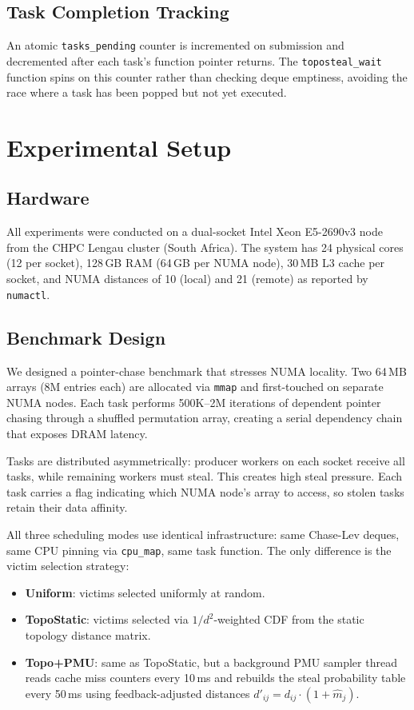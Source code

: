 \documentclass[conference]{IEEEtran}
\begin{document}
\subsection{Task Completion Tracking}

An atomic \texttt{tasks\_pending} counter is incremented on submission and decremented after each task's function pointer returns. The \texttt{toposteal\_wait} function spins on this counter rather than checking deque emptiness, avoiding the race where a task has been popped but not yet executed.

\section{Experimental Setup}

\subsection{Hardware}

All experiments were conducted on a dual-socket Intel Xeon E5-2690v3 node from the CHPC Lengau cluster (South Africa). The system has 24 physical cores (12 per socket), 128\,GB RAM (64\,GB per NUMA node), 30\,MB L3 cache per socket, and NUMA distances of 10 (local) and 21 (remote) as reported by \texttt{numactl}.

\subsection{Benchmark Design}

We designed a pointer-chase benchmark that stresses NUMA locality. Two 64\,MB arrays (8M entries each) are allocated via \texttt{mmap} and first-touched on separate NUMA nodes. Each task performs 500K--2M iterations of dependent pointer chasing through a shuffled permutation array, creating a serial dependency chain that exposes DRAM latency.

Tasks are distributed asymmetrically: producer workers on each socket receive all tasks, while remaining workers must steal. This creates high steal pressure. Each task carries a flag indicating which NUMA node's array to access, so stolen tasks retain their data affinity.

All three scheduling modes use identical infrastructure: same Chase-Lev deques, same CPU pinning via \texttt{cpu\_map}, same task function. The only difference is the victim selection strategy:
\begin{itemize}
    \item \textbf{Uniform}: victims selected uniformly at random.
    \item \textbf{TopoStatic}: victims selected via $1/d^2$-weighted CDF from the static topology distance matrix.
    \item \textbf{Topo+PMU}: same as TopoStatic, but a background PMU sampler thread reads cache miss counters every 10\,ms and rebuilds the steal probability table every 50\,ms using feedback-adjusted distances $d'_{ij} = d_{ij} \cdot (1 + \hat{m}_j)$.
\end{itemize}
\end{document}
